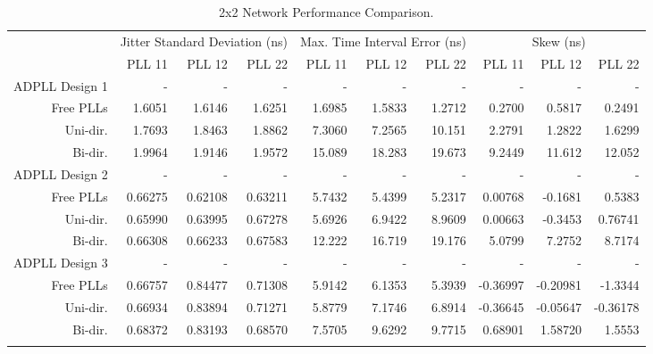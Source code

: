 \begin{table}[!ht]
    \begin{center}
        \begin{footnotesize}
            \setlength{\tabcolsep}{.9\tabcolsep}
            \begin{tabular}{ll|r|r|r|r|r|r|r|r|r|}           
                \cline{3-11}
                && \multicolumn{3}{c|}{Jitter Standard Deviation (ns)} & \multicolumn{3}{c|}{Max. Time Interval Error (ns)} & \multicolumn{3}{c|}{Skew (ns)} \T\\
                \cline{3-11} 
                &&PLL 11&PLL 12&PLL 22    &PLL 11&PLL 12&PLL 22    &PLL 11&PLL 12&PLL 22\T\\
                \hline
                \multicolumn{2}{|l|}{\ac{ADPLL} Design 1}&-&-&-&-&-&-&-&-&-\T\\
                \multicolumn{2}{|r|}{Free PLLs} &1.6051  &1.6146  &1.6251     &1.6985 &1.5833 &1.2712    &0.2700 &0.5817 &0.2491 \T\\
                \multicolumn{2}{|r|}{Uni-dir.}  &1.7693  &1.8463  &1.8862     &7.3060 &7.2565 &10.151    &2.2791 &1.2822 &1.6299 \T\\
                \multicolumn{2}{|r|}{Bi-dir.}   &1.9964  &1.9146  &1.9572     &15.089 &18.283 &19.673    &9.2449 &11.612 &12.052 \T\\
                \hline
                \multicolumn{2}{|l|}{\ac{ADPLL} Design 2}&-&-&-&-&-&-&-&-&-\T\\
                \multicolumn{2}{|r|}{Free PLLs} &0.66275 &0.62108 &0.63211    &5.7432 &5.4399 &5.2317    &0.00768 &-0.1681 &0.5383  \T\\
                \multicolumn{2}{|r|}{Uni-dir.}  &0.65990 &0.63995 &0.67278    &5.6926 &6.9422 &8.9609    &0.00663 &-0.3453 &0.76741 \T\\
                \multicolumn{2}{|r|}{Bi-dir.}   &0.66308 &0.66233 &0.67583    &12.222 &16.719 &19.176    &5.0799  & 7.2752 &8.7174  \T\\
                \hline
                \multicolumn{2}{|l|}{\ac{ADPLL} Design 3}&-&-&-&-&-&-&-&-&-\T\\
                \multicolumn{2}{|r|}{Free PLLs} &0.66757 &0.84477 &0.71308    &5.9142 &6.1353 &5.3939    &-0.36997 &-0.20981 &-1.3344  \T\\
                \multicolumn{2}{|r|}{Uni-dir.}  &0.66934 &0.83894 &0.71271    &5.8779 &7.1746 &6.8914    &-0.36645 &-0.05647 &-0.36178 \T\\
                \multicolumn{2}{|r|}{Bi-dir.}   &0.68372 &0.83193 &0.68570    &7.5705 &9.6292 &9.7715    & 0.68901 & 1.58720 & 1.5553  \T\\
                \hline
                \B                
            \end{tabular}
        \end{footnotesize}
        \caption{2x2 Network Performance Comparison.}
        \label{table:2x2perf}
    \end{center}
    \vspace{-0.5cm}
\end{table}
